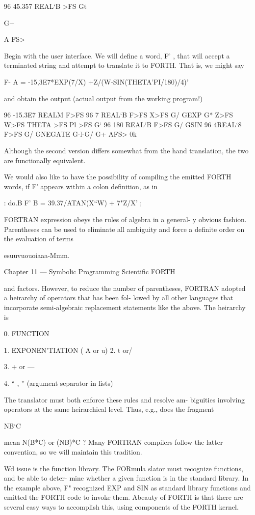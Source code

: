 96 45.357 REAL‘B >FS
Gt

G+

A FS>

Begin with the user interface. We will define a word, F' , that
will accept a terminated string and attempt to translate it to
FORTH. That is, we might say

F- A = -15,3E7*EXP(7/X) +Z/(W-SIN(THETA'PI/180)/4)'

and obtain the output (actual output from the working program!)

96 -15.3E7 REALM F>FS 96 7 REAL‘B F>FS
X>FS G/ GEXP G* Z>FS W>FS
THETA >FS Pl >FS G‘ 96 180 REAL‘B F>FS
G/ GSIN 96 4REAL‘8 F>FS G/ GNEGATE
G-l-G/ G+ AFS> 0k

Although the second version differs somewhat from the hand
translation, the two are functionally equivalent.

We would also like to have the possibility of compiling the emitted
FORTH words, if F' appears within a colon definition, as in

: do.B F' B = 39.37/ATAN(X“W) + 7"Z/X' ;

FORTRAN expression obeys the rules of algebra in a general-
y obvious fashion. Parentheses can be used to eliminate all
ambiguity and force a definite order on the evaluation of terms

esuuvuouoiaaa-Mmm.

Chapter 11 — Symbolic Programming Scientific FORTH

and factors. However, to reduce the number of parentheses,
FORTRAN adopted a heirarchy of operators that has been fol-
lowed by all other languages that incorporate semi-algebraic
replacement statements like the above. The heirarchy is

0. FUNCTION

1. EXPONEN'TIATION ( A or u)
2. t or/

3. + or —

4. “ , ” (argument separator in lists)

The translator must both enforce these rules and resolve am-
biguities involving operators at the same heirarchical level. Thus,
e.g., does the fragment

NB‘C

mean N(B*C) or (NB)*C ? Many FORTRAN compilers follow
the latter convention, so we will maintain this tradition.

Wd issue is the function library. The FORmula
slator must recognize functions, and be able to deter-
mine whether a given function is in the standard library. In the
example above, F" recognized EXP and SIN as standard library
functions and emitted the FORTH code to invoke them. Abeauty
of FORTH is that there are several easy ways to accomplish this,
using components of the FORTH kernel.

